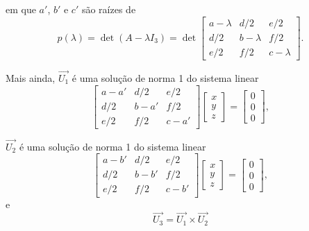 \documentclass{beamer}
\begin{document}
\begin{frame}
    \begin{teorema}
        em que $a'$, \pause $b'$ \pause e $c'$ \pause são raízes de\pause
        \[
            p(\lambda) = \det(A - \lambda I_3) = \det \begin{bmatrix}
                a - \lambda & d/2         & e/2         \\
                d/2         & b - \lambda & f/2         \\
                e/2         & f/2         & c - \lambda
            \end{bmatrix}.
        \]\pause

        Mais ainda, \pause $\vec{U_1}$ \pause é uma solução de norma 1 \pause do sistema linear\pause
        \[
            \begin{bmatrix}
                a - a' & d/2    & e/2    \\
                d/2    & b - a' & f/2    \\
                e/2    & f/2    & c - a'
            \end{bmatrix} \begin{bmatrix}
                x \\y\\z
            \end{bmatrix} = \begin{bmatrix}
                0 \\0\\0
            \end{bmatrix},
        \]
    \end{teorema}
\end{frame}

\begin{frame}
    \begin{teorema}
        $\vec{U_2}$ \pause é uma solução de norma 1 \pause do sistema linear\pause
        \[
            \begin{bmatrix}
                a - b' & d/2    & e/2    \\
                d/2    & b - b' & f/2    \\
                e/2    & f/2    & c - b'
            \end{bmatrix} \begin{bmatrix}
                x \\y\\z
            \end{bmatrix} = \begin{bmatrix}
                0 \\0\\0
            \end{bmatrix},
        \]\pause
        e
        \[
            \vec{U_3} = \vec{U_1} \times \vec{U_2}
        \]
    \end{teorema}
\end{frame}
\end{document}
